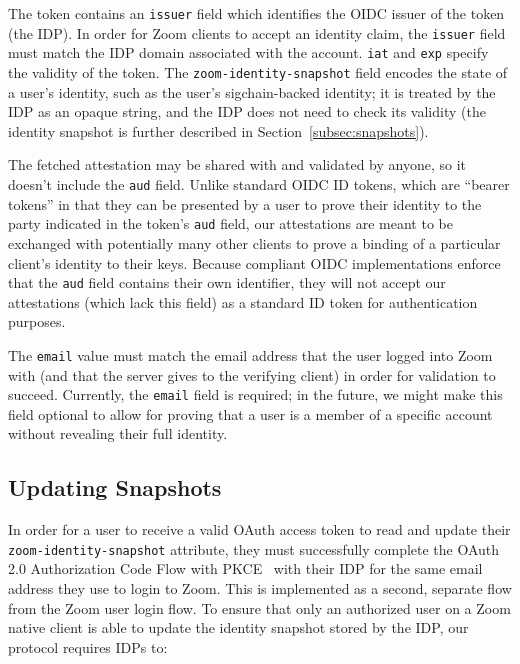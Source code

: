 The token contains an \texttt{issuer} field which identifies the OIDC issuer of the token (the IDP). In
order for Zoom clients to accept an identity claim, the \texttt{issuer} field must match
the IDP domain associated with the account.
\texttt{iat} and \texttt{exp} specify the validity of the token. The
\texttt{zoom-identity-snapshot} field encodes the state of a user’s identity,
such as the user's sigchain-backed identity; it is treated by the IDP as
an opaque string, and the IDP does not need to check its validity (the identity
snapshot is further described in Section~\ref{subsec:snapshots}).  

The fetched attestation may be shared with and validated by anyone, so it
doesn't include the \texttt{aud} field. Unlike standard OIDC ID tokens, which
are ``bearer tokens'' in that they can be presented by a user to prove their
identity to the party indicated in the token's \texttt{aud} field, our
attestations are meant to be exchanged with potentially many other clients to
prove a binding of a particular client's identity to their keys. Because
compliant OIDC implementations enforce that the \texttt{aud} field contains
their own identifier, they will not accept our attestations (which lack this
field) as a standard ID token for authentication purposes.

The \texttt{email} value must match the email address that the user logged into
Zoom with (and that the server gives to the verifying client) in order for validation to succeed.  Currently, the
\texttt{email} field is required; in the future, we might make this field
optional to allow for proving that a user is a member of a specific account
without revealing their full identity.

\subsection{Updating Snapshots}\label{subsec:generateattestation}
In order for a user to receive a valid OAuth access token to read and update their
\texttt{zoom-identity-snapshot} attribute, they must successfully complete the
OAuth 2.0 Authorization Code Flow with PKCE~\cite{rfc7636} with their IDP for the same email address they
use to login to Zoom. This is implemented as a second, separate flow from the
Zoom user login flow. To ensure that only an authorized user on a Zoom native
client is able to update the identity snapshot stored by the IDP, our protocol
requires IDPs to:

